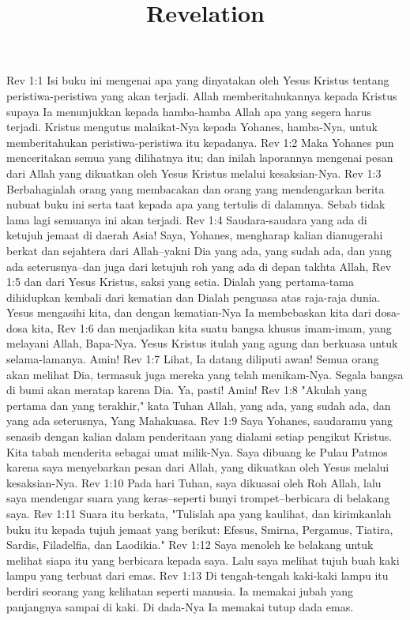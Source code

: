 

\title{Revelation}

Rev 1:1  Isi buku ini mengenai apa yang dinyatakan oleh Yesus Kristus tentang peristiwa-peristiwa yang akan terjadi. Allah memberitahukannya kepada Kristus supaya Ia menunjukkan kepada hamba-hamba Allah apa yang segera harus terjadi. Kristus mengutus malaikat-Nya kepada Yohanes, hamba-Nya, untuk memberitahukan peristiwa-peristiwa itu kepadanya.
Rev 1:2  Maka Yohanes pun menceritakan semua yang dilihatnya itu; dan inilah laporannya mengenai pesan dari Allah yang dikuatkan oleh Yesus Kristus melalui kesaksian-Nya.
Rev 1:3  Berbahagialah orang yang membacakan dan orang yang mendengarkan berita nubuat buku ini serta taat kepada apa yang tertulis di dalamnya. Sebab tidak lama lagi semuanya ini akan terjadi.
Rev 1:4  Saudara-saudara yang ada di ketujuh jemaat di daerah Asia! Saya, Yohanes, mengharap kalian dianugerahi berkat dan sejahtera dari Allah--yakni Dia yang ada, yang sudah ada, dan yang ada seterusnya--dan juga dari ketujuh roh yang ada di depan takhta Allah,
Rev 1:5  dan dari Yesus Kristus, saksi yang setia. Dialah yang pertama-tama dihidupkan kembali dari kematian dan Dialah penguasa atas raja-raja dunia. Yesus mengasihi kita, dan dengan kematian-Nya Ia membebaskan kita dari dosa-dosa kita,
Rev 1:6  dan menjadikan kita suatu bangsa khusus imam-imam, yang melayani Allah, Bapa-Nya. Yesus Kristus itulah yang agung dan berkuasa untuk selama-lamanya. Amin!
Rev 1:7  Lihat, Ia datang diliputi awan! Semua orang akan melihat Dia, termasuk juga mereka yang telah menikam-Nya. Segala bangsa di bumi akan meratap karena Dia. Ya, pasti! Amin!
Rev 1:8  "Akulah yang pertama dan yang terakhir," kata Tuhan Allah, yang ada, yang sudah ada, dan yang ada seterusnya, Yang Mahakuasa.
Rev 1:9  Saya Yohanes, saudaramu yang senasib dengan kalian dalam penderitaan yang dialami setiap pengikut Kristus. Kita tabah menderita sebagai umat milik-Nya. Saya dibuang ke Pulau Patmos karena saya menyebarkan pesan dari Allah, yang dikuatkan oleh Yesus melalui kesaksian-Nya.
Rev 1:10  Pada hari Tuhan, saya dikuasai oleh Roh Allah, lalu saya mendengar suara yang keras--seperti bunyi trompet--berbicara di belakang saya.
Rev 1:11  Suara itu berkata, "Tulislah apa yang kaulihat, dan kirimkanlah buku itu kepada tujuh jemaat yang berikut: Efesus, Smirna, Pergamus, Tiatira, Sardis, Filadelfia, dan Laodikia."
Rev 1:12  Saya menoleh ke belakang untuk melihat siapa itu yang berbicara kepada saya. Lalu saya melihat tujuh buah kaki lampu yang terbuat dari emas.
Rev 1:13  Di tengah-tengah kaki-kaki lampu itu berdiri seorang yang kelihatan seperti manusia. Ia memakai jubah yang panjangnya sampai di kaki. Di dada-Nya Ia memakai tutup dada emas.
